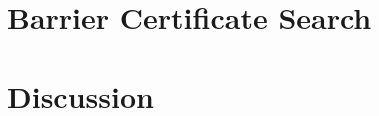\chapter{Barrier Certificate Search}\label{chap:sostools}
	
%	
%
%
%


\chapter{Discussion}\label{chap:conclusion}


\label{totalpage}

\begingroup
\raggedright
\clearpage
{}

\endgroup
\label{sourceliste}

\newpage


